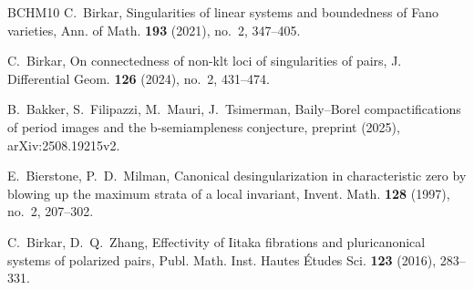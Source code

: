 \documentclass[12pt]{amsart}
\theoremstyle{definition}
\begin{document}
\begin{thebibliography}{BCHM10}
C.~Birkar, Singularities of linear systems and boundedness of Fano varieties, Ann. of Math. {\textbf{193}} (2021), no.~2, 347--405. 

C.~Birkar, 
On connectedness of non-klt loci of singularities of pairs, 
J. Differential Geom. {\textbf{126}} (2024), no.~2, 431--474.






 B.~Bakker, S.~Filipazzi, M.~Mauri, J.~Tsimerman, Baily--Borel compactifications of period images and the b-semiampleness conjecture, preprint (2025), arXiv:2508.19215v2. 




 E.~Bierstone, P.~D.~Milman, Canonical desingularization in characteristic zero by blowing up the maximum strata of a local invariant, Invent. Math. {\textbf{128}} (1997), no.~2, 207--302. 



 C.~Birkar, D.~Q.~Zhang, Effectivity of Iitaka fibrations and pluricanonical systems of polarized pairs, Publ. Math. Inst. Hautes \'Etudes Sci. {\textbf{123}} (2016), 283--331. 


\end{thebibliography}
\end{document}
